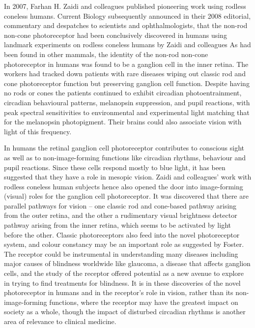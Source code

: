 In 2007, Farhan H. Zaidi and colleagues published pioneering work using rodless coneless humans. Current Biology subsequently announced in their 2008 editorial, commentary and despatches to scientists and ophthalmologists, that the non-rod non-cone photoreceptor had been conclusively discovered in humans using landmark experiments on rodless coneless humans by Zaidi and colleagues As had been found in other mammals, the identity of the non-rod non-cone photoreceptor in humans was found to be a ganglion cell in the inner retina. The workers had tracked down patients with rare diseases wiping out classic rod and cone photoreceptor function but preserving ganglion cell function. Despite having no rods or cones the patients continued to exhibit circadian photoentrainment, circadian behavioural patterns, melanopsin suppression, and pupil reactions, with peak spectral sensitivities to environmental and experimental light matching that for the melanopsin photopigment. Their brains could also associate vision with light of this frequency.

In humans the retinal ganglion cell photoreceptor contributes to conscious sight as well as to non-image-forming functions like circadian rhythms, behaviour and pupil reactions. Since these cells respond mostly to blue light, it has been suggested that they have a role in mesopic vision. Zaidi and colleagues' work with rodless coneless human subjects hence also opened the door into image-forming (visual) roles for the ganglion cell photoreceptor. It was discovered that there are parallel pathways for vision -- one classic rod and cone-based pathway arising from the outer retina, and the other a rudimentary visual brightness detector pathway arising from the inner retina, which seems to be activated by light before the other. Classic photoreceptors also feed into the novel photoreceptor system, and colour constancy may be an important role as suggested by Foster. The receptor could be instrumental in understanding many diseases including major causes of blindness worldwide like glaucoma, a disease that affects ganglion cells, and the study of the receptor offered potential as a new avenue to explore in trying to find treatments for blindness. It is in these discoveries of the novel photoreceptor in humans and in the receptor's role in vision, rather than its non-image-forming functions, where the receptor may have the greatest impact on society as a whole, though the impact of disturbed circadian rhythms is another area of relevance to clinical medicine.

